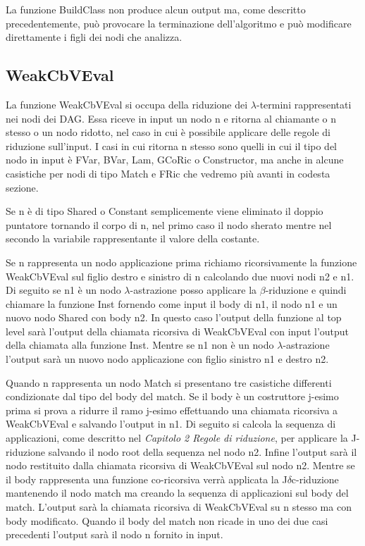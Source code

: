 \documentclass[12pt,a4paper,openright,twoside]{report}
\begin{document}
La funzione BuildClass non produce alcun output ma, come descritto precedentemente, pu\`o provocare la terminazione dell'algoritmo e pu\`o modificare direttamente i figli dei nodi che analizza.

\subsection{WeakCbVEval}
La funzione WeakCbVEval si occupa della riduzione dei $\lambda$-termini rappresentati nei nodi dei DAG. Essa riceve in input un nodo n e ritorna al chiamante o n stesso o un nodo ridotto, nel caso in cui \`e possibile applicare delle regole di riduzione sull'input.\newline
I casi in cui ritorna n stesso sono quelli in cui il tipo del nodo in input \`e FVar, BVar, Lam, GCoRic o Constructor, ma anche in alcune casistiche per nodi di tipo Match e FRic che vedremo pi\`u avanti in codesta sezione.\newline

Se n \`e di tipo Shared o Constant semplicemente viene eliminato il doppio puntatore tornando il corpo di n, nel primo caso il nodo sherato mentre nel secondo la variabile rappresentante il valore della costante.\newline

Se n rappresenta un nodo applicazione prima richiamo ricorsivamente la funzione WeakCbVEval sul figlio destro e sinistro di n calcolando due nuovi nodi n2 e n1.\newline
Di seguito se n1 \`e un nodo $\lambda$-astrazione posso applicare la $\beta$-riduzione e quindi chiamare la funzione Inst fornendo come input il body di n1, il nodo n1 e un nuovo nodo Shared con body n2. In questo caso l'output della funzione al top level sar\`a l'output della chiamata ricorsiva di WeakCbVEval con input l'output della chiamata alla funzione Inst. \newline
Mentre se n1 non \`e un nodo $\lambda$-astrazione l'output sar\`a un nuovo nodo applicazione con figlio sinistro n1 e destro n2.\newline

Quando n rappresenta un nodo Match si presentano tre casistiche differenti condizionate dal tipo del body del match. \newline
Se il body \`e un costruttore j-esimo prima si prova a ridurre il ramo j-esimo effettuando una chiamata ricorsiva a WeakCbVEval e salvando l'output in n1. Di seguito si calcola la sequenza di applicazioni, come descritto nel \textit{Capitolo 2 Regole di riduzione}, per applicare la J-riduzione salvando il nodo root della sequenza nel nodo n2. Infine l'output sar\`a il nodo restituito dalla chiamata ricorsiva di WeakCbVEval sul nodo n2.\newline
Mentre se il body rappresenta una funzione co-ricorsiva verr\`a applicata la J$\delta$c-riduzione mantenendo il nodo match ma creando la sequenza di applicazioni sul body del match. L'output sar\`a la chiamata ricorsiva di WeakCbVEval su n stesso ma con body modificato.\newline
Quando il body del match non ricade in uno dei due casi precedenti l'output sar\`a il nodo n fornito in input.\newline
\end{document}
